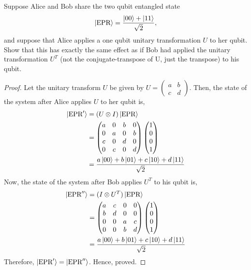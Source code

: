 \begin{solution}[label=ques:1]
  \begin{question}
    Suppose Alice and Bob share the two qubit entangled state
\[
  \ket{\text{EPR}} = \frac{\ket{00}+\ket{11}}{\sqrt{2}} ,
\]
and suppose that Alice applies a one qubit unitary transformation $U$ to her qubit.
Show that this has exactly the same effect as if Bob had applied the unitary transformation $U^T$ (not the conjugate-transpose of U, just the transpose) to his qubit.
  \end{question}
  \tcblower{}
  \begin{proof}
    Let the unitary transform $U$ be given by $U = \begin{pmatrix} a & b \\ c & d \end{pmatrix}$.
    Then, the state of the system after Alice applies $U$ to her qubit is,
    \begin{equation}
      \begin{split}
        \ket{\text{EPR}'} &= (U \otimes I)\ket{\text{EPR}}\\
        &= \begin{pmatrix}
          a & 0 & b & 0\\
          0 & a & 0 & b\\
          c & 0 & d & 0\\
          0 & c & 0 & d
        \end{pmatrix}\begin{pmatrix}
          1\\
          0\\
          0\\
          1
        \end{pmatrix}\\
        &= \frac{a\ket{00} + b\ket{01} + c\ket{10} + d\ket{11}}{\sqrt{2}}
      \end{split}
    \end{equation}
    Now, the state of the system after Bob applies $U^T$ to his qubit is,
    \begin{equation}
      \begin{split}
        \ket{\text{EPR}''} &= (I \otimes U^T)\ket{\text{EPR}}\\
        &= \begin{pmatrix}
          a & c & 0 & 0\\
          b & d & 0 & 0\\
          0 & 0 & a & c\\
          0 & 0 & b & d
        \end{pmatrix}\begin{pmatrix}
          1\\
          0\\
          0\\
          1
        \end{pmatrix}\\
        &= \frac{a\ket{00} + b\ket{01} + c\ket{10} + d\ket{11}}{\sqrt{2}}
      \end{split}
    \end{equation}
    Therefore, $\ket{\text{EPR}'} = \ket{\text{EPR}''}$. Hence, proved.
  \end{proof}
\end{solution}

